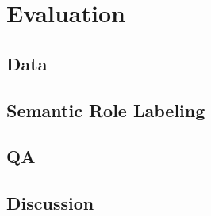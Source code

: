 \section{Evaluation}

\subsection{Data}


\subsection{Semantic Role Labeling}


\subsection{QA}


\subsection{Discussion}